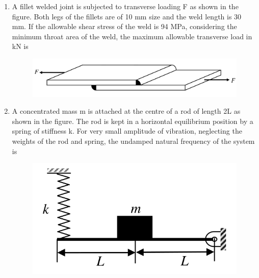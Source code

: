 \documentclass[journal,11pt,onecolumn]{IEEEtran}
\begin{document}
\begin{enumerate}[resume]
    \item A fillet welded joint is subjected to transverse loading F as shown in the figure. Both legs of the fillets are of 10 mm size and the weld length is 30 mm. If the allowable shear stress of the weld is 94 MPa, considering the minimum throat area of the weld, the maximum allowable transverse load in kN is
          \begin{figure}[H]
              \centering
              \includegraphics[scale=0.2]{q32}
              \caption{}
              \label{q32}
          \end{figure}
          \begin{enumerate}
          \end{enumerate}

    \item A concentrated mass m is attached at the centre of a rod of length 2L as shown in the figure. The rod is kept in a horizontal equilibrium position by a spring of stiffness k. For very small amplitude of vibration, neglecting the weights of the rod and spring, the undamped natural frequency of the system is
          \begin{figure}[H]
              \centering
              \includegraphics[scale=0.2]{q33}
              \caption{}
              \label{q33}
          \end{figure}


\end{enumerate}
\end{document}
